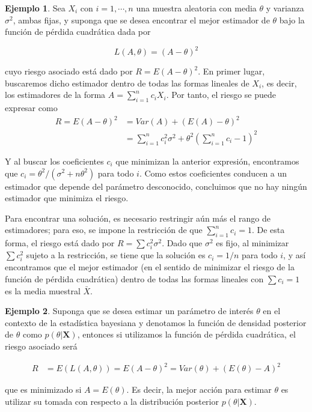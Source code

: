 \documentclass[
  10pt,
  spanish,
]{book}
\theoremstyle{definition}
\theoremstyle{definition}
\newtheorem{example}{Ejemplo}[chapter]
\theoremstyle{definition}
\theoremstyle{definition}
\theoremstyle{remark}
\begin{document}
\begin{example}
\protect\hypertarget{exm:unnamed-chunk-1}{}{\label{exm:unnamed-chunk-1} }Sea \(X_i\) con \(i=1,\cdots, n\) una muestra aleatoria con media \(\theta\) y varianza \(\sigma^2\), ambas fijas, y suponga que se desea encontrar el mejor estimador de \(\theta\) bajo la función de pérdida cuadrática dada por

\begin{equation*}
L(A,\theta)=(A-\theta)^2
\end{equation*}

cuyo riesgo asociado está dado por \(R=E(A-\theta)^2\). En primer lugar, buscaremos dicho estimador dentro de todas las formas lineales de \(X_i\), es decir, los estimadores de la forma \(A=\sum_{i=1}^nc_iX_i\). Por tanto, el riesgo se puede expresar como
\begin{align*}
R=E(A-\theta)^2&=Var(A)+(E(A)-\theta)^2\\
&=\sum_{i=1}^nc_i^2\sigma^2+\theta^2(\sum_{i=1}^nc_i-1)^2
\end{align*}

Y al buscar los coeficientes \(c_i\) que minimizan la anterior expresión, encontramos que \(c_i=\theta^2/(\sigma^2+n\theta^2)\) para todo \(i\). Como estos coeficientes conducen a un estimador que depende del parámetro desconocido, concluimos que no hay ningún estimador que minimiza el riesgo.

Para encontrar una solución, es necesario restringir aún más el rango de estimadores; para eso, se impone la restricción de que \(\sum_{i=1}^n c_i=1\). De esta forma, el riesgo está dado por \(R=\sum c_i^2\sigma^2\). Dado que \(\sigma^2\) es fijo, al minimizar \(\sum c_i^2\) sujeto a la restricción, se tiene que la solución es \(c_i=1/n\) para todo \(i\), y así encontramos que el mejor estimador (en el sentido de minimizar el riesgo de la función de pérdida cuadrática) dentro de todas las formas lineales con \(\sum c_i=1\) es la media muestral \(\bar{X}\).
\end{example}

\begin{example}
\protect\hypertarget{exm:unnamed-chunk-2}{}{\label{exm:unnamed-chunk-2} }Suponga que se desea estimar un parámetro de interés \(\theta\) en el contexto de la estadística bayesiana y denotamos la función de densidad posterior de \(\theta\) como \(p(\theta|\mathbf{X})\), entonces si utilizamos la función de pérdida cuadrática, el riesgo asociado será

\begin{align*}
R&=E(L(A,\theta))=E (A-\theta)^2=Var(\theta)+(E(\theta)-A)^2
\end{align*}

que es minimizado si \(A=E(\theta)\). Es decir, la mejor acción para estimar \(\theta\) es utilizar su tomada con respecto a la distribución posterior \(p(\theta|\mathbf{X})\).
\end{example}
\end{document}
